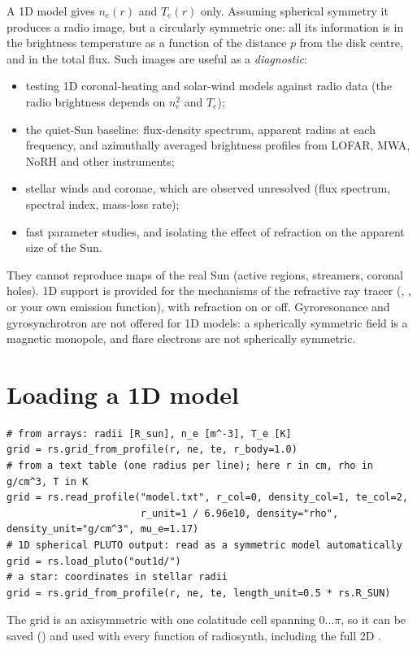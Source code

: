 A 1D model gives $n_e(r)$ and $T_e(r)$ only. Assuming spherical symmetry it produces a
radio image, but a circularly symmetric one: all its information is in the brightness
temperature as a function of the distance $p$ from the disk centre, and in the total
flux. Such images are useful as a \emph{diagnostic}:
\begin{itemize}[itemsep=1pt]
\item testing 1D coronal-heating and solar-wind models against radio data (the radio
  brightness depends on $n_e^2$ and $T_e$);
\item the quiet-Sun baseline: flux-density spectrum, apparent radius at each frequency, and
  azimuthally averaged brightness profiles from LOFAR, MWA, NoRH and other instruments;
\item stellar winds and coronae, which are observed unresolved (flux spectrum, spectral
  index, mass-loss rate);
\item fast parameter studies, and isolating the effect of refraction on the apparent size
  of the Sun.
\end{itemize}
They cannot reproduce maps of the real Sun (active regions, streamers, coronal holes).
1D support is provided for the mechanisms of the refractive ray tracer
(, , or your own emission function), with refraction
on or off. Gyroresonance and gyrosynchrotron are not offered for 1D models: a spherically
symmetric field is a magnetic monopole, and flare electrons are not spherically
symmetric.

\section{Loading a 1D model}
\begin{lstlisting}[style=pyex]
# from arrays: radii [R_sun], n_e [m^-3], T_e [K]
grid = rs.grid_from_profile(r, ne, te, r_body=1.0)
# from a text table (one radius per line); here r in cm, rho in g/cm^3, T in K
grid = rs.read_profile("model.txt", r_col=0, density_col=1, te_col=2,
                       r_unit=1 / 6.96e10, density="rho", density_unit="g/cm^3", mu_e=1.17)
# 1D spherical PLUTO output: read as a symmetric model automatically
grid = rs.load_pluto("out1d/")
# a star: coordinates in stellar radii
grid = rs.grid_from_profile(r, ne, te, length_unit=0.5 * rs.R_SUN)
\end{lstlisting}
The grid is an axisymmetric  with one colatitude cell spanning
$0\ldots\pi$, so it can be saved () and used with every function of
radiosynth, including the full 2D .

